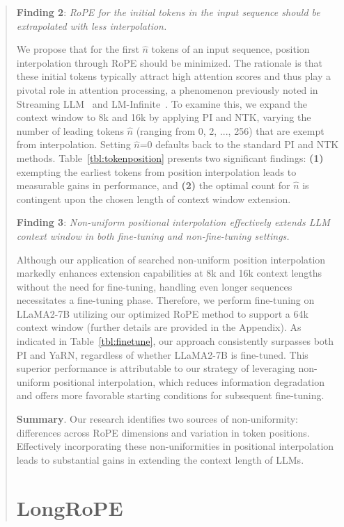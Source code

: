 \begin{abstract}
\textbf{Finding 2}: \textit{RoPE for the initial tokens in the input sequence should be extrapolated with less interpolation.} 

We propose that for the first $\hat{n}$ tokens of an input sequence, position interpolation through RoPE should be minimized. The rationale is that these initial tokens typically attract high attention scores and thus play a pivotal role in attention processing, a phenomenon previously noted in Streaming LLM~\cite{streamingllm} and LM-Infinite~\cite{han2023lminfinite}. To examine this, we expand the context window to 8k and 16k by applying PI and NTK, varying the number of leading tokens $\hat n$ (ranging from 0, 2, ..., 256) that are exempt from interpolation. Setting $\hat n$=0 defaults back to the standard PI and NTK methods. Table~\ref{tbl:tokenposition} presents two significant findings: \textbf{(1)} exempting the earliest tokens from position interpolation leads to measurable gains in performance, and \textbf{(2)} the optimal count for $\hat n$ is contingent upon the chosen length of context window extension.

\textbf{Finding 3}: \textit{Non-uniform positional interpolation effectively extends LLM context window in both fine-tuning and non-fine-tuning settings.} 

Although our application of searched non-uniform position interpolation markedly enhances extension capabilities at 8k and 16k context lengths without the need for fine-tuning, handling even longer sequences necessitates a fine-tuning phase. Therefore, we perform fine-tuning on LLaMA2-7B utilizing our optimized RoPE method to support a 64k context window (further details are provided in the Appendix). As indicated in Table~\ref{tbl:finetune}, our approach consistently surpasses both PI and YaRN, regardless of whether LLaMA2-7B is fine-tuned. This superior performance is attributable to our strategy of leveraging non-uniform positional interpolation, which reduces information degradation and offers more favorable starting conditions for subsequent fine-tuning.

\textbf{Summary}. Our research identifies two sources of non-uniformity: differences across RoPE dimensions and variation in token positions. Effectively incorporating these non-uniformities in positional interpolation leads to substantial gains in extending the context length of LLMs.

\section{LongRoPE}


\end{abstract}
